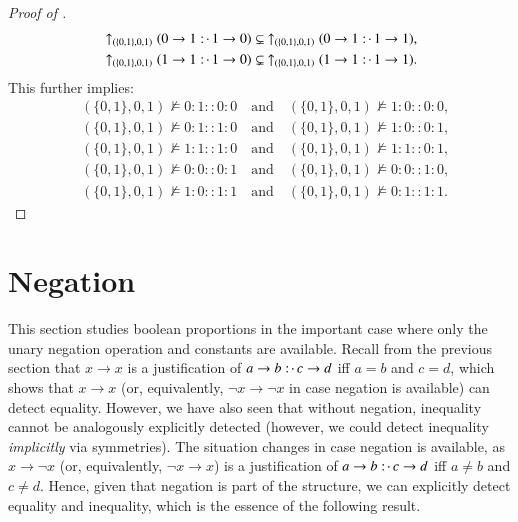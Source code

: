 \documentclass[11pt]{amsart}
\theoremstyle{definition} %
\newcommand{\righttherefore}{:\joinrel\cdot\,}
\begin{document}
\begin{proof}[Proof of ]
\begin{align*}
	&\uparrow_{(\{0,1\},0,1)}(0\to 1\righttherefore 1\to 0)\subsetneq\ \uparrow_{(\{0,1\},0,1)}(0\to 1\righttherefore 1\to 1),\\
	&\uparrow_{(\{0,1\},0,1)}(1\to 1\righttherefore 1\to 0)\subsetneq\ \uparrow_{(\{0,1\},0,1)}(1\to 1\righttherefore 1\to 1).
\end{align*} This further implies:
\begin{align} 
	\label{equ:B01_notmodels_0100_1000} &(\{0,1\},0,1)\not\models 0:1::0:0 \quad\text{and}\quad (\{0,1\},0,1)\not\models 1:0::0:0,\\
	\label{equ:B01_notmodels_0110_1001} &(\{0,1\},0,1)\not\models 0:1::1:0 \quad\text{and}\quad (\{0,1\},0,1)\not\models 1:0::0:1,\\
	\label{equ:B01_notmodels_1110_1101} &(\{0,1\},0,1)\not\models 1:1::1:0 \quad\text{and}\quad (\{0,1\},0,1)\not\models 1:1::0:1,\\
	\label{equ:B01_notmodels_0001_0010} &(\{0,1\},0,1)\not\models 0:0::0:1 \quad\text{and}\quad (\{0,1\},0,1)\not\models 0:0::1:0,\\
	\label{equ:B01_notmodels_1011_0111} &(\{0,1\},0,1)\not\models 1:0::1:1 \quad\text{and}\quad (\{0,1\},0,1)\not\models 0:1::1:1.
\end{align}
\end{proof}

\section{Negation}\label{§:Negation}

This section studies boolean proportions in the important case where only the unary negation operation and constants are available. Recall from the previous section that $x\to x$ is a justification of $a\to b\righttherefore c\to d$ iff $a=b$ and $c=d$, which shows that $x\to x$ (or, equivalently, $\neg x\to\neg x$ in case negation is available) can detect equality. However, we have also seen that without negation, inequality cannot be analogously explicitly detected (however, we could detect inequality \textit{implicitly} via symmetries). The situation changes in case negation is available, as $x\to\neg x$ (or, equivalently, $\neg x\to x$) is a justification of $a\to b\righttherefore c\to d$ iff $a\neq b$ and $c\neq d$. Hence, given that negation is part of the structure, we can explicitly detect equality and inequality, which is the essence of the following result.
\end{document}
